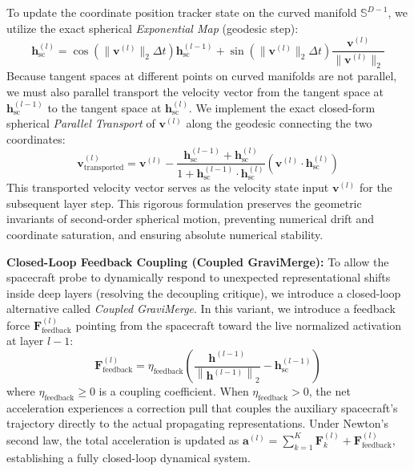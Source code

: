 To update the coordinate position tracker state on the curved manifold $\mathbb{S}^{D-1}$, we utilize the exact spherical \textit{Exponential Map} (geodesic step):
\vspace{-3pt}
\begin{equation}
    \mathbf{h}_{\text{sc}}^{(l)} = \cos(\|\mathbf{v}^{(l)}\|_2 \Delta t) \mathbf{h}_{\text{sc}}^{(l-1)} + \sin(\|\mathbf{v}^{(l)}\|_2 \Delta t) \frac{\mathbf{v}^{(l)}}{\|\mathbf{v}^{(l)}\|_2}
    \label{eq:exponential_map}
\end{equation}
\vspace{-3pt}
Because tangent spaces at different points on curved manifolds are not parallel, we must also parallel transport the velocity vector from the tangent space at $\mathbf{h}_{\text{sc}}^{(l-1)}$ to the tangent space at $\mathbf{h}_{\text{sc}}^{(l)}$. We implement the exact closed-form spherical \textit{Parallel Transport} of $\mathbf{v}^{(l)}$ along the geodesic connecting the two coordinates:
\vspace{-3pt}
\begin{equation}
    \mathbf{v}^{(l)}_{\text{transported}} = \mathbf{v}^{(l)} - \frac{\mathbf{h}_{\text{sc}}^{(l-1)} + \mathbf{h}_{\text{sc}}^{(l)}}{1 + \mathbf{h}_{\text{sc}}^{(l-1)} \cdot \mathbf{h}_{\text{sc}}^{(l)}} \left( \mathbf{v}^{(l)} \cdot \mathbf{h}_{\text{sc}}^{(l)} \right)
    \label{eq:parallel_transport}
\end{equation}
\vspace{-3pt}
This transported velocity vector serves as the velocity state input $\mathbf{v}^{(l)}$ for the subsequent layer step. This rigorous formulation preserves the geometric invariants of second-order spherical motion, preventing numerical drift and coordinate saturation, and ensuring absolute numerical stability.

\textbf{Closed-Loop Feedback Coupling (Coupled GraviMerge): } To allow the spacecraft probe to dynamically respond to unexpected representational shifts inside deep layers (resolving the decoupling critique), we introduce a closed-loop alternative called \textit{Coupled GraviMerge}. In this variant, we introduce a feedback force $\mathbf{F}_{\text{feedback}}^{(l)}$ pointing from the spacecraft toward the live normalized activation at layer $l-1$:
\vspace{-3pt}
\begin{equation}
    \mathbf{F}_{\text{feedback}}^{(l)} = \eta_{\text{feedback}} \left( \frac{\mathbf{h}^{(l-1)}}{\left\| \mathbf{h}^{(l-1)} \right\|_2} - \mathbf{h}_{\text{sc}}^{(l-1)} \right)
    \label{eq:feedback_force}
\end{equation}
\vspace{-3pt}
where $\eta_{\text{feedback}} \ge 0$ is a coupling coefficient. When $\eta_{\text{feedback}} > 0$, the net acceleration experiences a correction pull that couples the auxiliary spacecraft's trajectory directly to the actual propagating representations. Under Newton's second law, the total acceleration is updated as $\mathbf{a}^{(l)} = \sum_{k=1}^K \mathbf{F}_k^{(l)} + \mathbf{F}_{\text{feedback}}^{(l)}$, establishing a fully closed-loop dynamical system.

